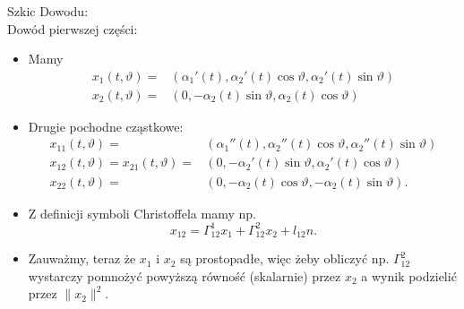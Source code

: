 \begin{frame}[allowdisplaybreaks=4,squeeze]
\textcolor{ared}{Szkic Dowodu:}\\\pause 
Dowód pierwszej części:
\begin{itemize}
\item Mamy \vspace*{-0.1in}
\begin{align*}
x_1(t,\vartheta)=&(\alpha_1'(t),\alpha_2'(t)\cos\vartheta,\alpha_2'(t)\sin\vartheta)\\
x_2(t,\vartheta)=&(0,-\alpha_2(t)\sin\vartheta,\alpha_2(t)\cos\vartheta)
\end{align*}\vspace*{-0.2in}
\pause \item Drugie pochodne cząstkowe:
\begin{align*}
x_{11}(t,\vartheta)=&(\alpha_1''(t),\alpha_2''(t)\cos\vartheta,\alpha_2''(t)\sin\vartheta)\\
x_{12}(t,\vartheta)=x_{21}(t,\vartheta)=&(0,-\alpha_2'(t)\sin\vartheta,\alpha_2'(t)\cos\vartheta)\\
x_{22}(t,\vartheta)=&(0,-\alpha_2(t)\cos\vartheta,-\alpha_2(t)\sin\vartheta).
\end{align*}\vspace*{-0.2in}
\pause \item Z definicji symboli Christoffela mamy np.
\[x_{12}=\Gamma_{12}^1x_1+\Gamma_{12}^2x_2+l_{12}n.\]

\pause\item Zauważmy, teraz że $x_1$ i $x_2$ są prostopadłe, więc żeby obliczyć np. $\Gamma_{12}^2$ wystarczy pomnożyć powyższą równość (skalarnie) przez $x_2$ a wynik podzielić przez $\|x_2\|^2$.
\end{itemize}
\end{frame}

